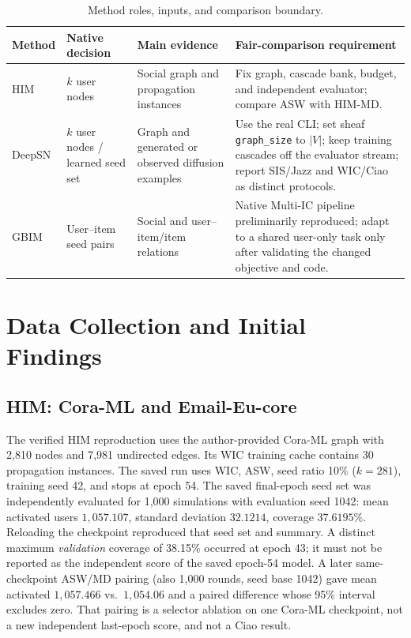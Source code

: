 \documentclass[10pt,twocolumn]{article}
\begin{document}
\begin{table}[t]
\centering\footnotesize
\caption{Method roles, inputs, and comparison boundary.}
\label{tab:roles}
\begin{tabularx}{\textwidth}{@{}L{0.11\textwidth}L{0.20\textwidth}L{0.24\textwidth}X@{}}
\toprule
Method & Native decision & Main evidence & Fair-comparison requirement \\
\midrule
HIM & $k$ user nodes & Social graph and propagation instances & Fix graph, cascade bank, budget, and independent evaluator; compare ASW with HIM-MD. \\
DeepSN & $k$ user nodes / learned seed set & Graph and generated or observed diffusion examples & Use the real CLI; set sheaf \texttt{graph\_size} to $|V|$; keep training cascades off the evaluator stream; report SIS/Jazz and WIC/Ciao as distinct protocols. \\
GBIM & User--item seed pairs & Social and user--item/item relations & Native Multi-IC pipeline preliminarily reproduced; adapt to a shared user-only task only after validating the changed objective and code. \\
\bottomrule
\end{tabularx}
\end{table}

\section{Data Collection and Initial Findings}
\subsection{HIM: Cora-ML and Email-Eu-core}
The verified HIM reproduction uses the author-provided Cora-ML graph with 2,810 nodes and 7,981 undirected edges. Its WIC training cache contains 30 propagation instances. The saved run uses WIC, ASW, seed ratio 10\% ($k=281$), training seed 42, and stops at epoch 54. The saved final-epoch seed set was independently evaluated for 1,000 simulations with evaluation seed 1042: mean activated users $1{,}057.107$, standard deviation $32.1214$, coverage $37.6195\%$. Reloading the checkpoint reproduced that seed set and summary. A distinct maximum \emph{validation} coverage of 38.15\% occurred at epoch 43; it must not be reported as the independent score of the saved epoch-54 model. A later same-checkpoint ASW/MD pairing (also 1,000 rounds, seed base 1042) gave mean activated $1{,}057.466$ vs.\ $1{,}054.06$ and a paired difference whose 95\% interval excludes zero. That pairing is a selector ablation on one Cora-ML checkpoint, not a new independent last-epoch score, and not a Ciao result.
\end{document}
